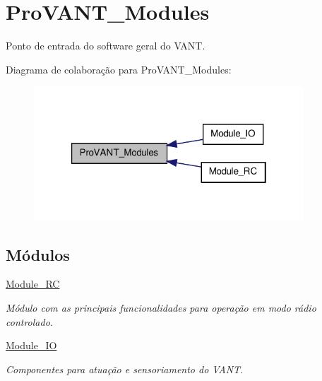 \hypertarget{group__ProVANT__Modules}{\section{Pro\-V\-A\-N\-T\-\_\-\-Modules}
\label{group__ProVANT__Modules}
}


Ponto de entrada do software geral do V\-A\-N\-T.  


Diagrama de colaboração para Pro\-V\-A\-N\-T\-\_\-\-Modules\-:
\nopagebreak
\begin{figure}[H]
\begin{center}
\leavevmode
\includegraphics[width=286pt]{group__ProVANT__Modules}
\end{center}
\end{figure}
\subsection*{Módulos}
\begin{DoxyCompactItemize}
\item 
\hyperlink{group__Module__RC}{Module\-\_\-\-R\-C}
\begin{DoxyCompactList}\small\item\em Módulo com as principais funcionalidades para operação em modo rádio controlado. \end{DoxyCompactList}\item 
\hyperlink{group__Module__IO}{Module\-\_\-\-I\-O}
\begin{DoxyCompactList}\small\item\em Componentes para atuação e sensoriamento do V\-A\-N\-T. \end{DoxyCompactList}\end{DoxyCompactItemize}
